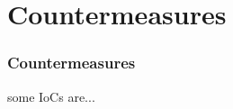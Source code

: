 \section{Countermeasures}

\begin{frame}
\frametitle{Countermeasures}
    some IoCs are...
\end{frame}